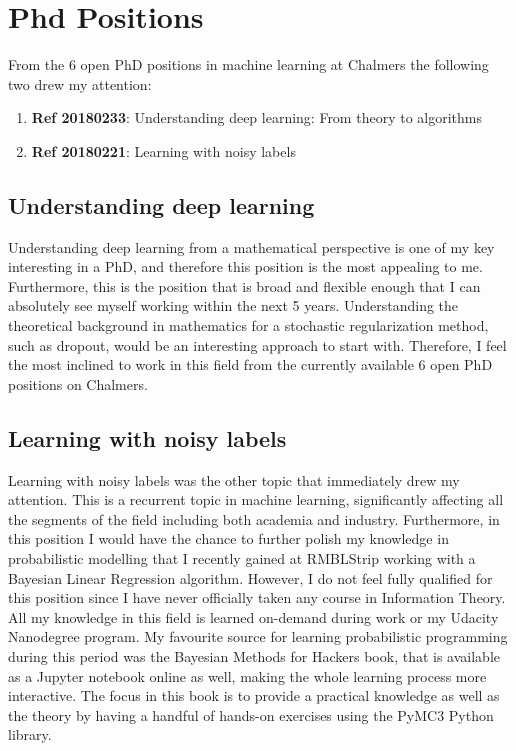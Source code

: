 \documentclass[12pt]{article}
\begin{document}
\section*{Phd Positions}
From the 6 open PhD positions in machine learning at Chalmers the following two drew my attention:
\begin{enumerate}
    \item \textbf{Ref 20180233}: Understanding deep learning: From theory to algorithms
    \item \textbf{Ref 20180221}: Learning with noisy labels
\end{enumerate}

\subsection*{Understanding deep learning}
Understanding deep learning from a mathematical perspective is one of my key interesting in a PhD, and therefore this position is the most appealing to me. Furthermore, this is the position that is broad and flexible enough that I can absolutely see myself working within the next 5 years. Understanding the theoretical background in mathematics for a stochastic regularization method, such as dropout, would be an interesting approach to start with. Therefore, I feel the most inclined to work in this field from the currently available 6 open PhD positions on Chalmers.

\subsection*{Learning with noisy labels}
Learning with noisy labels was the other topic that immediately drew my attention. This is a recurrent topic in machine learning, significantly affecting all the segments of the field including both academia and industry. Furthermore, in this position I would have the chance to further polish my knowledge in probabilistic modelling that I recently gained at RMBLStrip working with a Bayesian Linear Regression algorithm. However, I do not feel fully qualified for this position since I have never officially taken any course in Information Theory. All my knowledge in this field is learned on-demand during work or my Udacity Nanodegree program. My favourite source for learning probabilistic programming during this period was the Bayesian Methods for Hackers book\cite{probabilistic_programming}, that is available as a Jupyter notebook online as well, making the whole learning process more interactive. The focus in this book is to provide a practical knowledge as well as the theory by having a handful of hands-on exercises using the PyMC3 Python library.
\end{document}
